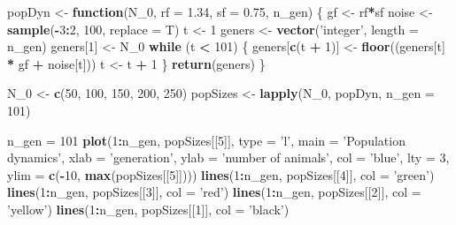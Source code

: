 \documentclass[]{book}
\newenvironment{Shaded}{\begin{snugshade}}{\end{snugshade}}
\newcommand{\KeywordTok}[1]{\textcolor[rgb]{0.13,0.29,0.53}{\textbf{#1}}}
\newcommand{\DataTypeTok}[1]{\textcolor[rgb]{0.13,0.29,0.53}{#1}}
\newcommand{\DecValTok}[1]{\textcolor[rgb]{0.00,0.00,0.81}{#1}}
\newcommand{\FloatTok}[1]{\textcolor[rgb]{0.00,0.00,0.81}{#1}}
\newcommand{\StringTok}[1]{\textcolor[rgb]{0.31,0.60,0.02}{#1}}
\newcommand{\ControlFlowTok}[1]{\textcolor[rgb]{0.13,0.29,0.53}{\textbf{#1}}}
\newcommand{\OperatorTok}[1]{\textcolor[rgb]{0.81,0.36,0.00}{\textbf{#1}}}
\newcommand{\NormalTok}[1]{#1}
\theoremstyle{definition}
\theoremstyle{definition}
\theoremstyle{definition}
\theoremstyle{remark}
\begin{document}
\begin{Shaded}
\begin{Highlighting}[]
\NormalTok{popDyn <-}\StringTok{ }\ControlFlowTok{function}\NormalTok{(N_}\DecValTok{0}\NormalTok{, }\DataTypeTok{rf =} \FloatTok{1.34}\NormalTok{, }\DataTypeTok{sf =} \FloatTok{0.75}\NormalTok{, n_gen) \{}
\NormalTok{  gf    <-}\StringTok{ }\NormalTok{rf}\OperatorTok{*}\NormalTok{sf}
\NormalTok{  noise <-}\StringTok{ }\KeywordTok{sample}\NormalTok{(}\OperatorTok{-}\DecValTok{3}\OperatorTok{:}\DecValTok{2}\NormalTok{, }\DecValTok{100}\NormalTok{, }\DataTypeTok{replace =}\NormalTok{ T)}
\NormalTok{  t <-}\StringTok{ }\DecValTok{1}
\NormalTok{  geners <-}\StringTok{ }\KeywordTok{vector}\NormalTok{(}\StringTok{'integer'}\NormalTok{, }\DataTypeTok{length =}\NormalTok{ n_gen)}
\NormalTok{  geners[}\DecValTok{1}\NormalTok{] <-}\StringTok{ }\NormalTok{N_}\DecValTok{0}
  \ControlFlowTok{while}\NormalTok{ (t }\OperatorTok{<}\StringTok{ }\DecValTok{101}\NormalTok{) \{}
\NormalTok{  geners[}\KeywordTok{c}\NormalTok{(t }\OperatorTok{+}\StringTok{ }\DecValTok{1}\NormalTok{)] <-}\StringTok{ }\KeywordTok{floor}\NormalTok{((geners[t] }\OperatorTok{*}\StringTok{ }\NormalTok{gf }\OperatorTok{+}\StringTok{ }\NormalTok{noise[t]))}
\NormalTok{  t <-}\StringTok{ }\NormalTok{t }\OperatorTok{+}\StringTok{ }\DecValTok{1}
\NormalTok{  \}}
  \KeywordTok{return}\NormalTok{(geners)}
\NormalTok{\}}

\NormalTok{N_}\DecValTok{0}\NormalTok{   <-}\StringTok{ }\KeywordTok{c}\NormalTok{(}\DecValTok{50}\NormalTok{, }\DecValTok{100}\NormalTok{, }\DecValTok{150}\NormalTok{, }\DecValTok{200}\NormalTok{, }\DecValTok{250}\NormalTok{)}
\NormalTok{popSizes <-}\StringTok{ }\KeywordTok{lapply}\NormalTok{(N_}\DecValTok{0}\NormalTok{, popDyn, }\DataTypeTok{n_gen =} \DecValTok{101}\NormalTok{)}

\NormalTok{n_gen =}\StringTok{ }\DecValTok{101}
\KeywordTok{plot}\NormalTok{(}\DecValTok{1}\OperatorTok{:}\NormalTok{n_gen, popSizes[[}\DecValTok{5}\NormalTok{]], }\DataTypeTok{type =} \StringTok{'l'}\NormalTok{,}
     \DataTypeTok{main =} \StringTok{'Population dynamics'}\NormalTok{,}
     \DataTypeTok{xlab =} \StringTok{'generation'}\NormalTok{, }\DataTypeTok{ylab =} \StringTok{'number of animals'}\NormalTok{,}
     \DataTypeTok{col =} \StringTok{'blue'}\NormalTok{, }\DataTypeTok{lty =} \DecValTok{3}\NormalTok{, }\DataTypeTok{ylim =} \KeywordTok{c}\NormalTok{(}\OperatorTok{-}\DecValTok{10}\NormalTok{, }\KeywordTok{max}\NormalTok{(popSizes[[}\DecValTok{5}\NormalTok{]])))}
\KeywordTok{lines}\NormalTok{(}\DecValTok{1}\OperatorTok{:}\NormalTok{n_gen, popSizes[[}\DecValTok{4}\NormalTok{]], }\DataTypeTok{col =} \StringTok{'green'}\NormalTok{)}
\KeywordTok{lines}\NormalTok{(}\DecValTok{1}\OperatorTok{:}\NormalTok{n_gen, popSizes[[}\DecValTok{3}\NormalTok{]], }\DataTypeTok{col =} \StringTok{'red'}\NormalTok{)}
\KeywordTok{lines}\NormalTok{(}\DecValTok{1}\OperatorTok{:}\NormalTok{n_gen, popSizes[[}\DecValTok{2}\NormalTok{]], }\DataTypeTok{col =} \StringTok{'yellow'}\NormalTok{)}
\KeywordTok{lines}\NormalTok{(}\DecValTok{1}\OperatorTok{:}\NormalTok{n_gen, popSizes[[}\DecValTok{1}\NormalTok{]], }\DataTypeTok{col =} \StringTok{'black'}\NormalTok{)}
\end{Highlighting}
\end{Shaded}
\end{document}
